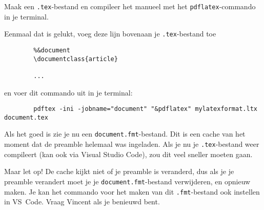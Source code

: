 \documentclass[a4paper]{article}
\begin{document}
\begin{exercise}
    Maak een \texttt{.tex}-bestand en compileer het manueel met het \texttt{pdflatex}-commando
    in je terminal.

    Eenmaal dat is gelukt, voeg deze lijn bovenaan je \texttt{.tex}-bestand toe
    \begin{verbatim}
        %&document
        \documentclass{article}

        ...
    \end{verbatim}
    en voer dit commando uit in je terminal:
    \begin{verbatim}
        pdftex -ini -jobname="document" "&pdflatex" mylatexformat.ltx document.tex
    \end{verbatim}

    Als het goed is zie je nu een \texttt{document.fmt}-bestand. Dit is een cache van het moment
    dat de preamble helemaal was ingeladen. Als je nu je \texttt{.tex}-bestand weer compileert
    (kan ook via Visual Studio Code), zou dit veel sneller moeten gaan.

    Maar let op! De cache kijkt niet of je preamble is veranderd, dus als je je preamble verandert
    moet je je \texttt{document.fmt}-bestand verwijderen, en opnieuw maken.
    Je kan het commando voor het maken van dit \texttt{.fmt}-bestand ook instellen in VS~Code.
    Vraag Vincent als je benieuwd bent.
\end{exercise}
\end{document}

